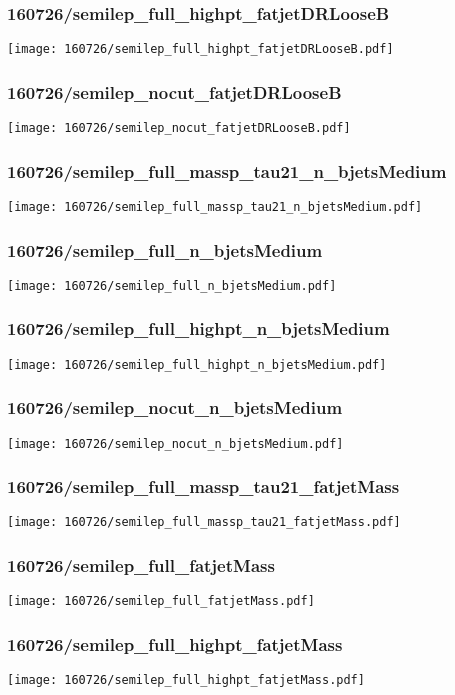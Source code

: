 \begin{frame}
   \frametitle{\small 160726/semilep\_full\_highpt\_fatjetDRLooseB}
   \centering
   \texttt{[image: 160726/semilep\_full\_highpt\_fatjetDRLooseB.pdf]}
\end{frame}

\begin{frame}
   \frametitle{\small 160726/semilep\_nocut\_fatjetDRLooseB}
   \centering
   \texttt{[image: 160726/semilep\_nocut\_fatjetDRLooseB.pdf]}
\end{frame}

\begin{frame}
   \frametitle{\small 160726/semilep\_full\_massp\_tau21\_n\_bjetsMedium}
   \centering
   \texttt{[image: 160726/semilep\_full\_massp\_tau21\_n\_bjetsMedium.pdf]}
\end{frame}

\begin{frame}
   \frametitle{\small 160726/semilep\_full\_n\_bjetsMedium}
   \centering
   \texttt{[image: 160726/semilep\_full\_n\_bjetsMedium.pdf]}
\end{frame}

\begin{frame}
   \frametitle{\small 160726/semilep\_full\_highpt\_n\_bjetsMedium}
   \centering
   \texttt{[image: 160726/semilep\_full\_highpt\_n\_bjetsMedium.pdf]}
\end{frame}

\begin{frame}
   \frametitle{\small 160726/semilep\_nocut\_n\_bjetsMedium}
   \centering
   \texttt{[image: 160726/semilep\_nocut\_n\_bjetsMedium.pdf]}
\end{frame}

\begin{frame}
   \frametitle{\small 160726/semilep\_full\_massp\_tau21\_fatjetMass}
   \centering
   \texttt{[image: 160726/semilep\_full\_massp\_tau21\_fatjetMass.pdf]}
\end{frame}

\begin{frame}
   \frametitle{\small 160726/semilep\_full\_fatjetMass}
   \centering
   \texttt{[image: 160726/semilep\_full\_fatjetMass.pdf]}
\end{frame}

\begin{frame}
   \frametitle{\small 160726/semilep\_full\_highpt\_fatjetMass}
   \centering
   \texttt{[image: 160726/semilep\_full\_highpt\_fatjetMass.pdf]}
\end{frame}

